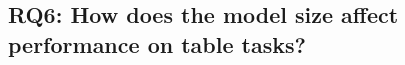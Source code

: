 \documentclass[11pt]{article}
\begin{document}
    
    



\subsection{RQ6: How does the model size affect performance on table tasks?}
\label{app-subsec: model-size}
\end{document}
